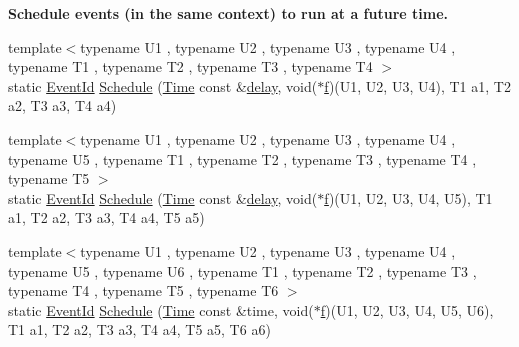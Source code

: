 \begin{Indent}{\bf Schedule events (in the same context) to run at a future time.}
\begin{DoxyCompactItemize}
\item 
{\footnotesize template$<$typename U1 , typename U2 , typename U3 , typename U4 , typename T1 , typename T2 , typename T3 , typename T4 $>$ }\\static \hyperlink{classns3_1_1EventId}{Event\+Id} \hyperlink{classns3_1_1Simulator_af726e3f6a604b2bb9adf846b63e192cd}{Schedule} (\hyperlink{classns3_1_1Time}{Time} const \&\hyperlink{mmwave_2model_2fading-traces_2fading__trace__generator_8m_a7964e6aa8f61a9d28973c8267a606ad8}{delay}, void($\ast$\hyperlink{80211b_8c_ae7ffc1a8f84fa47a0812b2f2b9627132}{f})(U1, U2, U3, U4), T1 a1, T2 a2, T3 a3, T4 a4)
\item 
{\footnotesize template$<$typename U1 , typename U2 , typename U3 , typename U4 , typename U5 , typename T1 , typename T2 , typename T3 , typename T4 , typename T5 $>$ }\\static \hyperlink{classns3_1_1EventId}{Event\+Id} \hyperlink{classns3_1_1Simulator_ab9f94b3f2f8faa84ba8a86804ab91b46}{Schedule} (\hyperlink{classns3_1_1Time}{Time} const \&\hyperlink{mmwave_2model_2fading-traces_2fading__trace__generator_8m_a7964e6aa8f61a9d28973c8267a606ad8}{delay}, void($\ast$\hyperlink{80211b_8c_ae7ffc1a8f84fa47a0812b2f2b9627132}{f})(U1, U2, U3, U4, U5), T1 a1, T2 a2, T3 a3, T4 a4, T5 a5)
\item 
{\footnotesize template$<$typename U1 , typename U2 , typename U3 , typename U4 , typename U5 , typename U6 , typename T1 , typename T2 , typename T3 , typename T4 , typename T5 , typename T6 $>$ }\\static \hyperlink{classns3_1_1EventId}{Event\+Id} \hyperlink{classns3_1_1Simulator_a50e5e9ec23e8709da58dfce44a25ef4e}{Schedule} (\hyperlink{classns3_1_1Time}{Time} const \&time, void($\ast$\hyperlink{80211b_8c_ae7ffc1a8f84fa47a0812b2f2b9627132}{f})(U1, U2, U3, U4, U5, U6), T1 a1, T2 a2, T3 a3, T4 a4, T5 a5, T6 a6)
\end{DoxyCompactItemize}
\end{Indent}
